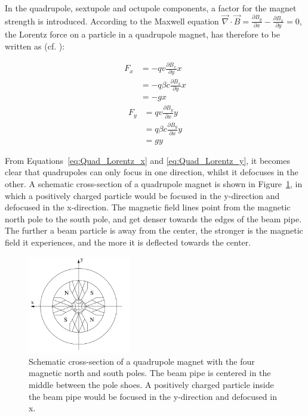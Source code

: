 In the quadrupole, sextupole and octupole components, a factor for the magnet strength is introduced.
According to the Maxwell equation $\vec{\nabla}\cdot\vec{B} = \frac{\partial B_y}{\partial x} -\frac{\partial B_x}{\partial y} = 0$, the Lorentz force on a particle in a quadrupole magnet, has therefore to be written as (cf. \cite[p. 372]{VacuumElectronics}):
\begin{multicols}{2}
\noindent 
\begin{align}
 F_x &= -qv\frac{\partial B_x}{\partial y}x \nonumber\\
  &= -q\beta c\frac{\partial B_x}{\partial y}x\\
  &= -gx\label{eq:Quad_Lorentz_x}
\end{align}
\columnbreak
\begin{align}
 F_y &= qv\frac{\partial B_y}{\partial x}y\nonumber \\
  &= q\beta c\frac{\partial B_y}{\partial x}y\\
  &= gy \label{eq:Quad_Lorentz_y}
\end{align}
\end{multicols}
From Equations~\ref{eq:Quad_Lorentz_x} and \ref{eq:Quad_Lorentz_y}, it becomes clear that quadrupoles can only focus in one direction, whilst it defocuses in the other.
A schematic cross-section of a quadrupole magnet is shown in Figure~\ref{fig:Quadrupole}, in which a positively charged particle would be focused in the y-direction and defocused in the x-direction.
The magnetic field lines point from the magnetic north pole to the south pole, and get denser towards the edges of the beam pipe.
The further a beam particle is away from the center, the stronger is the magnetic field it experiences, and the more it is deflected towards the center.
\begin{figure}
\centering
\includegraphics[width=0.4\textwidth]{Figures/Quadrupole.png}
\caption[Cross-section of a quadrupole magnet]{Schematic cross-section of a quadrupole magnet with the four magnetic north and south poles.
The beam pipe is centered in the middle between the pole shoes.
A positively charged particle inside the beam pipe would be focused in the y-direction and defocused in x.~\cite[p. 88]{Hinterberger}}
\label{fig:Quadrupole}
\end{figure}
